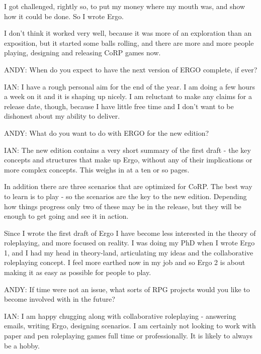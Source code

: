 \documentclass[twoside]{book}
\begin{document}
\begin{description}
I got challenged, rightly so, to put my money where my mouth was, and show how it could be done. So I wrote Ergo.

I don't think it worked very well, because it was more of an exploration than an exposition, but it started some balls rolling, and there are more and more people playing, designing and releasing CoRP games now.

\item{ANDY:} When do you expect to have the next version of ERGO complete, if ever?

\item{IAN:} I have a rough personal aim for the end of the year. I am doing a few hours a week on it and it is shaping up nicely. I am reluctant to make any claims for a release date, though, because I have little free time and I don't want to be dishonest about my ability to deliver.

\item{ANDY:} What do you want to do with ERGO for the new edition?

\item{IAN:} The new edition contains a very short summary of the first draft - the key concepts and structures that make up Ergo, without any of their implications or more complex concepts. This weighs in at a ten or so pages.

In addition there are three scenarios that are optimized for CoRP. The best way to learn is to play - so the scenarios are the key to the new edition. Depending how things progress only two of these may be in the release, but they will be enough to get going and see it in action.

Since I wrote the first draft of Ergo I have become less interested in the theory of roleplaying, and more focused on reality. I was doing my PhD when I wrote Ergo 1, and I had my head in theory-land, articulating my ideas and the collaborative roleplaying concept. I feel more earthed now in my job and so Ergo 2 is about making it as easy as possible for people to play.

\item{ANDY:} If time were not an issue, what sorts of RPG projects would you like to become involved with in the future?

\item{IAN:} I am happy chugging along with collaborative roleplaying - answering emails, writing Ergo, designing scenarios. I am certainly not looking to work with paper and pen roleplaying games full time or professionally. It is likely to always be a hobby.


\end{description}
\end{document}

